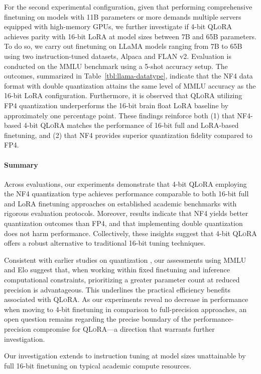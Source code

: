 For the second experimental configuration, given that performing comprehensive finetuning on models with 11B parameters or more demands multiple servers equipped with high-memory GPUs, we further investigate if 4-bit \textsc{QLoRA} achieves parity with 16-bit LoRA at model sizes between 7B and 65B parameters. To do so, we carry out finetuning on LLaMA models ranging from 7B to 65B using two instruction-tuned datasets, Alpaca and FLAN v2. Evaluation is conducted on the MMLU benchmark using a 5-shot accuracy setup. The outcomes, summarized in Table~\ref{tbl:llama-datatype}, indicate that the NF4 data format with double quantization attains the same level of MMLU accuracy as the 16-bit LoRA configuration. Furthermore, it is observed that \textsc{QLoRA} utilizing FP4 quantization underperforms the 16-bit brain float LoRA baseline by approximately one percentage point. These findings reinforce both (1) that NF4-based 4-bit \textsc{QLoRA} matches the performance of 16-bit full and LoRA-based finetuning, and (2) that NF4 provides superior quantization fidelity compared to FP4.

\paragraph{Summary} Across evaluations, our experiments demonstrate that 4-bit \textsc{QLoRA} employing the NF4 quantization type achieves performance comparable to both 16-bit full and LoRA finetuning approaches on established academic benchmarks with rigorous evaluation protocols. Moreover, results indicate that NF4 yields better quantization outcomes than FP4, and that implementing double quantization does not harm performance. Collectively, these insights suggest that 4-bit \textsc{QLoRA} offers a robust alternative to traditional 16-bit tuning techniques.

Consistent with earlier studies on quantization \citep{dettmers2022case}, our assessments using MMLU and Elo suggest that, when working within fixed finetuning and inference computational constraints, prioritizing a greater parameter count at reduced precision is advantageous. This underlines the practical efficiency benefits associated with \textsc{QLoRA}. As our experiments reveal no decrease in performance when moving to 4-bit finetuning in comparison to full-precision approaches, an open question remains regarding the precise boundary of the performance-precision compromise for \textsc{QLoRA}—a direction that warrants further investigation.

Our investigation extends to instruction tuning at model sizes unattainable by full 16-bit finetuning on typical academic compute resources.

